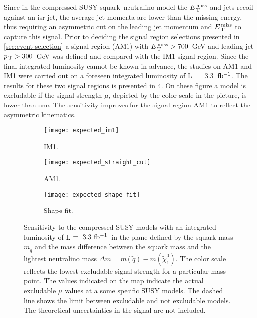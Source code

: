 Since in the compressed SUSY squark--neutralino model the $E_\mathrm{\, T}^\mathrm{\, miss}$ and jets recoil
against an \gls{isr} jet, the average jet momenta are lower than the missing
energy, thus requiring an asymmetric cut on the leading jet momentum and $E_\mathrm{\, T}^\mathrm{\, miss}$
to capture this signal. Prior to deciding the signal region selections presented
in \cref{sec:event-selection} a signal region (AM1) with $E_\mathrm{\, T}^\mathrm{\, miss} > 700$~GeV and
leading jet $p_\mathrm{\, T} > 300$~GeV was defined and compared with the IM1 signal
region. Since the final integrated luminosity cannot be known in advance, the
studies on AM1 and IM1 were carried out on a foreseen integrated luminosity of
L~=~3.3~$\mbox{fb$^{-1}$}$. The results for these two signal regions is presented in
\cref{fig:im1_straight_comparison}. On these figure a model is excludable if the
signal strength $\mu$, depicted by the color scale in the picture, is lower than
one. The sensitivity improves for the signal region AM1 to reflect the
asymmetric kinematics.
\begin{figure}[!h]
  \centering
  \begin{subfigure}[t]{.48\linewidth}
    \texttt{[image: expected\_im1]}
    \caption{IM1.}
    \label{fig:expected_im1}
  \end{subfigure}
  \begin{subfigure}[t]{.48\linewidth}
    \texttt{[image: expected\_straight\_cut]}
    \caption{AM1.}
    \label{fig:expected_straight}
  \end{subfigure}

  \begin{subfigure}[t]{.48\linewidth}
    \texttt{[image: expected\_shape\_fit]}
    \caption{Shape fit.}
    \label{fig:expected_shape}
  \end{subfigure}
  \caption{Sensitivity to the compressed SUSY models with an integrated
    luminosity of L$~=~3.3~\mbox{fb$^{-1}$}$~in the plane defined by the squark mass
    $m_{\tilde{q}}$ and the mass difference between the squark mass and the
    lightest neutralino mass
    $\Delta m = m(\tilde{q}) - m(\tilde{\chi}_{1}^{0})$. The color scale
    reflects the lowest excludable signal strength for a particular mass
    point. The values indicated on the map indicate the actual excludable $\mu$
    values at a some specific SUSY models. The dashed line shows the limit
    between excludable and not excludable models. The theoretical uncertainties
    in the signal are not included.}
  \label{fig:im1_straight_comparison}
\end{figure}

